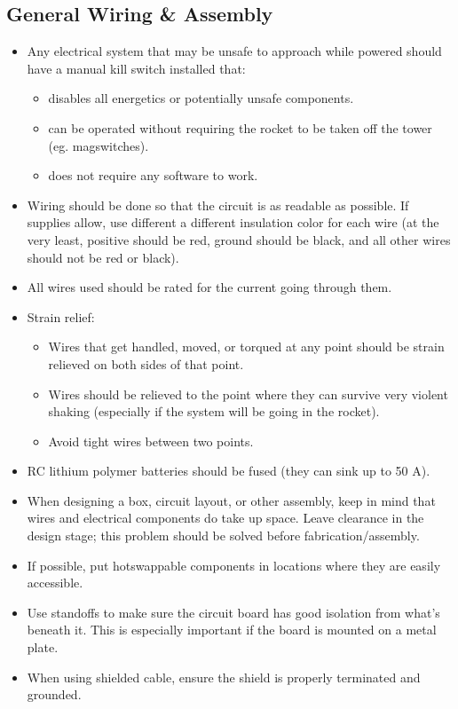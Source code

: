 \documentclass{article}
\begin{document}
\subsection{General Wiring \& Assembly}
\begin{itemize}
\item Any electrical system that may be unsafe to approach while powered should have a manual kill switch installed that:
    \begin{itemize}
    \item disables all energetics or potentially unsafe components.
    \item can be operated without requiring the rocket to be taken off the tower (eg. magswitches).
    \item does not require any software to work.
    \end{itemize}
\item Wiring should be done so that the circuit is as readable as possible. If supplies allow, use different a different insulation color for each wire (at the very least, positive should be red, ground should be black, and all other wires should not be red or black).
\item All wires used should be rated for the current going through them.
\item Strain relief:
    \begin{itemize}
    \item Wires that get handled, moved, or torqued at any point should be strain relieved on both sides of that point.
    \item Wires should be relieved to the point where they can survive very violent shaking (especially if the system will be going in the rocket).
    \item Avoid tight wires between two points.
    \end{itemize}
\item RC lithium polymer batteries should be fused (they can sink up to 50 A).
\item When designing a box, circuit layout, or other assembly, keep in mind that wires and electrical components do take up space. Leave clearance in the design stage; this problem should be solved before fabrication/assembly.
\item If possible, put hotswappable components in locations where they are easily accessible.
\item Use standoffs to make sure the circuit board has good isolation from what's beneath it. This is especially important if the board is mounted on a metal plate.
\item When using shielded cable, ensure the shield is properly terminated and grounded.
\end{itemize}
\end{document}
